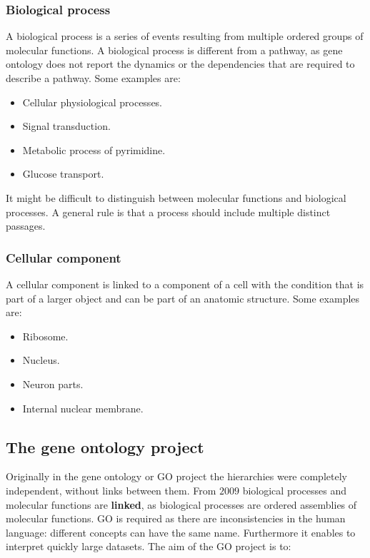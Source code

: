		\subsubsection{Biological process}
		A biological process is a series of events resulting from multiple ordered groups of molecular functions.
		A biological process is different from a pathway, as gene ontology does not report the dynamics or the dependencies that are required to describe a pathway.
		Some examples are:

		\begin{multicols}{4}
			\begin{itemize}
				\item Cellular physiological processes.
				\item Signal transduction.
				\item Metabolic process of pyrimidine.
				\item Glucose transport.
			\end{itemize}
		\end{multicols}
		It might be difficult to distinguish between molecular functions and biological processes.
		A general rule is that a process should include multiple distinct passages.

		\subsubsection{Cellular component}
		A cellular component is linked to a component of a cell with the condition that is part of a larger object and can be part of an anatomic structure.
		Some examples are:

		\begin{multicols}{4}
			\begin{itemize}
				\item Ribosome.
				\item Nucleus.
				\item Neuron parts.
				\item Internal nuclear membrane.
			\end{itemize}
		\end{multicols}
		

	\subsection{The gene ontology project}
	Originally in the gene ontology or GO project the hierarchies were completely independent, without links between them.
	From $2009$ biological processes and molecular functions are \textbf{linked}, as biological processes are ordered assemblies of molecular functions.
	GO is required as there are inconsistencies in the human language: different concepts can have the same name.
	Furthermore it enables to interpret quickly large datasets.
	The aim of the GO project is to:

